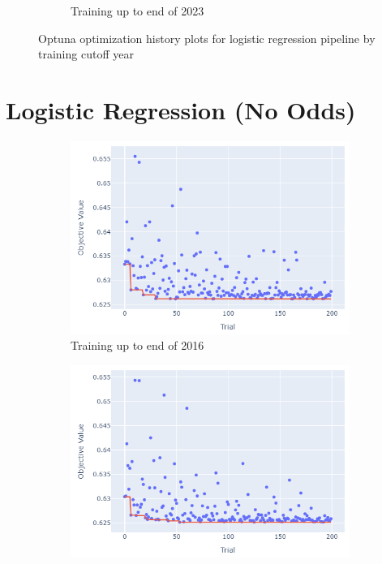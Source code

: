 \documentclass[12pt,twoside]{report}
\begin{document}
\begin{figure}[htb]
\begin{subfigure}{.33\linewidth}
  \caption{Training up to end of 2023}
\end{subfigure}
\par\bigskip
\caption{Optuna optimization history plots for logistic regression pipeline by training cutoff year}
\end{figure}

\newpage
\section{Logistic Regression (No Odds)}

\begin{figure}[htb]
\centering
\captionsetup{justification=centering}
\begin{subfigure}{.33\linewidth}
  \centering
  \includegraphics[width=0.95\linewidth]{figures/lr_no_odds_cutoff_2016.png}
  \caption{Training up to end of 2016}
\end{subfigure}%
\begin{subfigure}{.33\linewidth}
  \centering
  \includegraphics[width=0.95\linewidth]{figures/lr_no_odds_cutoff_2017.png}

\end{subfigure}
\end{figure}
\end{document}
